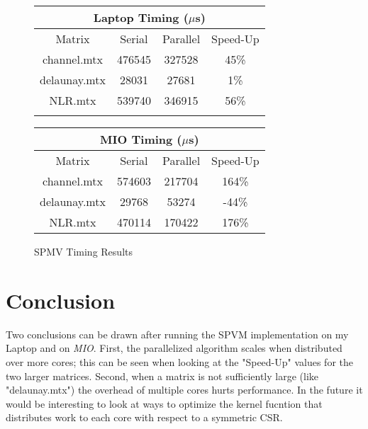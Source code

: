 \documentclass[pageno]{jpaper}
\begin{document}
\begin{figure}
\centering
\begin{tabular}{|c|c|c|c|}
    \hline
    \multicolumn{4}{|c|}{Laptop Timing ($\mu$s)} \\
    \hline
    Matrix & Serial & Parallel & Speed-Up\\
    \hline
    channel.mtx & 476545 & 327528 & 45\%\\
    delaunay.mtx & 28031 & 27681 & 1\%\\
    NLR.mtx & 539740 & 346915 & 56\%\\
    \hline
    \multicolumn{4}{c}{}
\end{tabular}
\begin{tabular}{|c|c|c|c|}
    \hline
    \multicolumn{4}{|c|}{MIO Timing ($\mu$s)}\\
    \hline
    Matrix & Serial & Parallel & Speed-Up\\
    \hline
    channel.mtx & 574603 & 217704 & 164\%\\
    delaunay.mtx & 29768 & 53274 & -44\%\\
    NLR.mtx & 470114 & 170422 & 176\%\\
    \hline
\end{tabular}
\caption{SPMV Timing Results}
    \label{fig:results}
\end{figure}


\section{Conclusion}
Two conclusions can be drawn after running the SPVM implementation
on my Laptop and on \textit{MIO}. First, the parallelized algorithm scales when
distributed over more cores; this can be seen when looking at the "Speed-Up"
values for the two larger matrices. Second, when a matrix is not sufficiently large 
(like "delaunay.mtx") the overhead of multiple cores hurts performance.
In the future it would be interesting to look at ways to optimize the kernel fucntion
that distributes work to each core with respect to a symmetric CSR.




\end{document}

